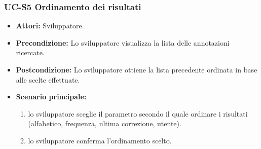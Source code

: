 	\subsubsection{UC-S5 Ordinamento dei risultati}
		\begin{itemize}
			\item \textbf{Attori:} Sviluppatore.
			\item \textbf{Precondizione:} Lo sviluppatore visualizza la lista delle annotazioni ricercate.
			\item \textbf{Postcondizione:} Lo sviluppatore ottiene la lista precedente ordinata in base alle scelte effettuate.
			\item \textbf{Scenario principale:}
				\begin{enumerate}
					\item lo sviluppatore sceglie il parametro secondo il quale ordinare i risultati (alfabetico, frequenza, ultima correzione, utente).
					\item lo sviluppatore conferma l'ordinamento scelto.
				\end{enumerate}
		\end{itemize} 
	
